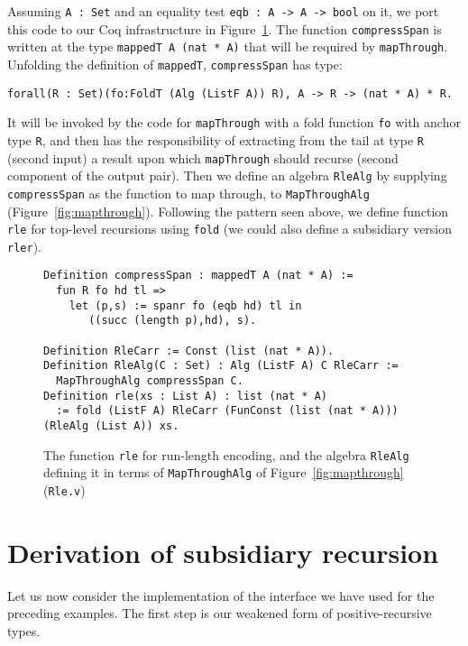 \documentclass[a4paper,USenglish]{lipics-v2021}
\begin{document}
Assuming \verb|A : Set| and an equality test \verb|eqb : A -> A -> bool| on it,
we port this code to our Coq infrastructure in Figure~\ref{fig:rle}.
The function \verb|compressSpan| is written at the type \verb|mappedT A (nat * A)| that
will be required by \verb|mapThrough|.  Unfolding the definition of \verb|mappedT|,
\verb|compressSpan| has type:
\begin{verbatim}
forall(R : Set)(fo:FoldT (Alg (ListF A)) R), A -> R -> (nat * A) * R.
\end{verbatim}
\noindent It will be invoked by the code for \verb|mapThrough| with a
fold function \verb|fo| with anchor type \verb|R|, and then has the
responsibility of extracting from the tail at type \verb|R| (second input) 
a result upon which \verb|mapThrough| should recurse (second component
of the output pair).  Then we define an algebra \verb|RleAlg| by
supplying \verb|compressSpan| as the function to map through, to
\verb|MapThroughAlg| (Figure~\ref{fig:mapthrough}).  Following the
pattern seen above, we define function \verb|rle| for top-level
recursions using \verb|fold| (we could also define a subsidiary version
\verb|rler|).



\begin{figure}
\begin{verbatim}
Definition compressSpan : mappedT A (nat * A) :=
  fun R fo hd tl => 
    let (p,s) := spanr fo (eqb hd) tl in
       ((succ (length p),hd), s).

Definition RleCarr := Const (list (nat * A)).
Definition RleAlg(C : Set) : Alg (ListF A) C RleCarr :=
  MapThroughAlg compressSpan C.
Definition rle(xs : List A) : list (nat * A)
  := fold (ListF A) RleCarr (FunConst (list (nat * A))) (RleAlg (List A)) xs.
\end{verbatim}
\caption{The function \texttt{rle} for run-length encoding, and the algebra \texttt{RleAlg} defining it
in terms of \texttt{MapThroughAlg} of Figure~\ref{fig:mapthrough} (\texttt{Rle.v})}
\label{fig:rle}
\end{figure}

\section{Derivation of subsidiary recursion}
\label{sec:deriv}

Let us now consider the implementation of the
interface we have used for the preceding examples.
The first step is our weakened form of positive-recursive
types.
\end{document}
